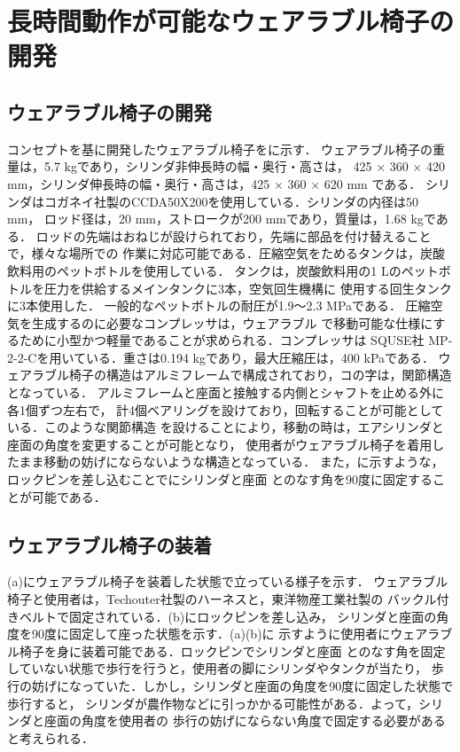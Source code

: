 \section{長時間動作が可能なウェアラブル椅子の開発}
\subsection{ウェアラブル椅子の開発}
コンセプトを基に開発したウェアラブル椅子をに示す．
ウェアラブル椅子の重量は，5.7 kgであり，シリンダ非伸長時の幅・奥行・高さは，
425 × 360 × 420 mm，シリンダ伸長時の幅・奥行・高さは，425 × 360 × 620 mm である．
シリンダはコガネイ社製のCCDA50X200を使用している．シリンダの内径は50 mm，
ロッド径は，20 mm，ストロークが200 mmであり，質量は，1.68 kgである．
ロッドの先端はおねじが設けられており，先端に部品を付け替えることで，様々な場所での
作業に対応可能である．圧縮空気をためるタンクは，炭酸飲料用のペットボトルを使用している．
タンクは，炭酸飲料用の1 Lのペットボトルを圧力を供給するメインタンクに3本，空気回生機構に
使用する回生タンクに3本使用した．
一般的なペットボトルの耐圧が1.9～2.3 MPaである\cite{petto}．
圧縮空気を生成するのに必要なコンプレッサは，ウェアラブル
で移動可能な仕様にするために小型かつ軽量であることが求められる．コンプレッサは
SQUSE社 MP-2-2-Cを用いている．重さは0.194 kgであり，最大圧縮圧は，400 kPaである．
ウェアラブル椅子の構造はアルミフレームで構成されており，コの字は，関節構造となっている．
アルミフレームと座面と接触する内側とシャフトを止める外に各1個ずつ左右で，
計4個ベアリングを設けており，回転することが可能としている．このような関節構造
を設けることにより，移動の時は，エアシリンダと座面の角度を変更することが可能となり，
使用者がウェアラブル椅子を着用したまま移動の妨げにならないような構造となっている．
また，に示すような，ロックピンを差し込むことでにシリンダと座面
とのなす角を90度に固定することが可能である．
\subsection{ウェアラブル椅子の装着}
(a)にウェアラブル椅子を装着した状態で立っている様子を示す．
ウェアラブル椅子と使用者は，Techouter社製のハーネスと，東洋物産工業社製の
バックル付きベルトで固定されている．(b)にロックピンを差し込み，
シリンダと座面の角度を90度に固定して座った状態を示す．(a)(b)に
示すように使用者にウェアラブル椅子を身に装着可能である．ロックピンでシリンダと座面
とのなす角を固定していない状態で歩行を行うと，使用者の脚にシリンダやタンクが当たり，
歩行の妨げになっていた．しかし，シリンダと座面の角度を90度に固定した状態で歩行すると，
シリンダが農作物などに引っかかる可能性がある．よって，シリンダと座面の角度を使用者の
歩行の妨げにならない角度で固定する必要があると考えられる．
